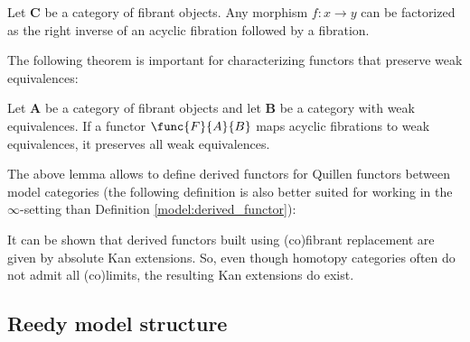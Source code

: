     \begin{theorem}
        Let $\mathbf{C}$ be a category of fibrant objects. Any morphism $f:x\rightarrow y$ can be factorized as the right inverse of an acyclic fibration followed by a fibration.
    \end{theorem}

    The following theorem is important for characterizing functors that preserve weak equivalences:
    \begin{theorem}\label{model:ken_brown}
        Let $\mathbf{A}$ be a category of fibrant objects and let $\mathbf{B}$ be a category with weak equivalences. If a functor $\func{F}{A}{B}$ maps acyclic fibrations to weak equivalences, it preserves all weak equivalences.
    \end{theorem}

    The above lemma allows to define derived functors for Quillen functors between model categories (the following definition is also better suited for working in the $\infty$-setting than Definition \ref{model:derived_functor}):
    \begin{property}\label{model:absolute_derived_functors}
        It can be shown that derived functors built using (co)fibrant replacement are given by absolute Kan extensions. So, even though homotopy categories often do not admit all (co)limits, the resulting Kan extensions do exist.
    \end{property}

\subsection{Reedy model structure}

